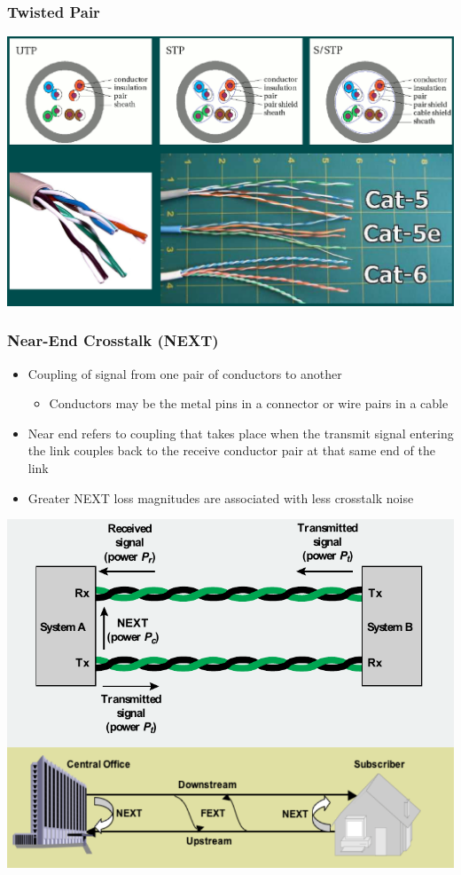 \documentclass[pdflatex,compress]{beamer}
\begin{document}
\begin{frame}
	\frametitle{Twisted Pair}
	\begin{center}
		\includegraphics[width=\linewidth]{img/img08}
	\end{center}
\end{frame}

\begin{frame}
	\frametitle{Near-End Crosstalk (NEXT)}
	\begin{itemize}
		\item Coupling of signal from one pair of
		conductors to another
		\begin{itemize}
			\item Conductors may be the metal pins in a connector or wire pairs in a cable
		\end{itemize}
		\item Near end refers to coupling that takes place when the transmit signal entering the link couples back to the receive conductor pair at that same end of the link
		\item Greater NEXT loss magnitudes are associated with less crosstalk noise
	\end{itemize}
\end{frame}

\begin{frame}
	\begin{center}
		\includegraphics[width=0.8\linewidth]{img/img09}
	\end{center}
\end{frame}
\end{document}
